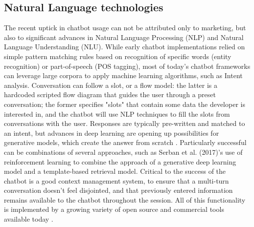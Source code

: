 \subsection{Natural Language technologies}
The recent uptick in chatbot usage can not be attributed only to marketing, but also to significant advances in Natural Language Processing (NLP) and Natural Language Understanding (NLU). 
While early chatbot implementations relied on simple pattern matching rules based on recognition of specific words (entity recognition) or part-of-speech (POS tagging), most of today's chatbot frameworks can leverage large corpora to apply machine learning algorithms, such as Intent analysis. Conversation can follow a slot, or a flow model: the latter is a hardcoded scripted flow diagram that guides the user through a preset conversation; the former specifies "slots" that contain some data the developer is interested in, and the chatbot will use NLP techniques to fill the slots from conversations with the user. Responses are typically pre-written and matched to an intent, but advances in deep learning are opening up possibilities for generative models, which create the answer from scratch \cite{Gregori}. Particularly successful can be combinations of several approaches, such as Serban et al. (2017)\cite{Serban2017}'s use of reinforcement learning to combine the approach of a generative deep learning model and a template-based retrieval model. Critical to the success of the chatbot is a good context management system, to ensure that a multi-turn conversation doesn't feel disjointed, and that previously entered information remains available to the chatbot throughout the session. All of this functionality is implemented by a growing variety of open source and commercial tools available today \cite{JavierCouto}.
